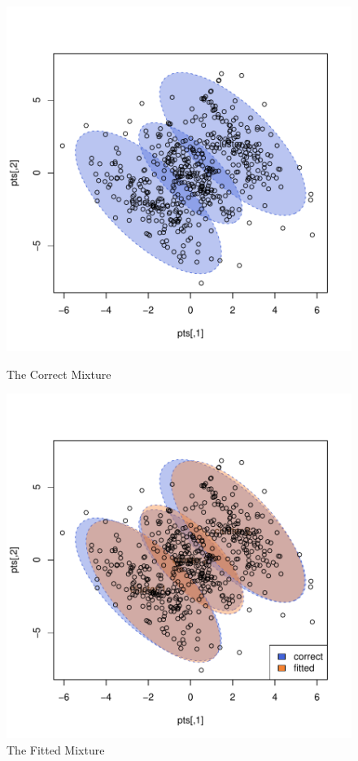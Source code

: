 \begin{figure}
    \centering
    \begin{minipage}{0.45\textwidth}
\includegraphics{chapter2-democorrect}
    \caption{The Correct Mixture}
    \label{fig:democorrect}
    \end{minipage}
    \begin{minipage}{0.45\textwidth}
    \centering
\includegraphics{chapter2-demofitted}
    \caption{The Fitted Mixture}
    \label{fig:demofitted}
    \end{minipage}
\end{figure}
